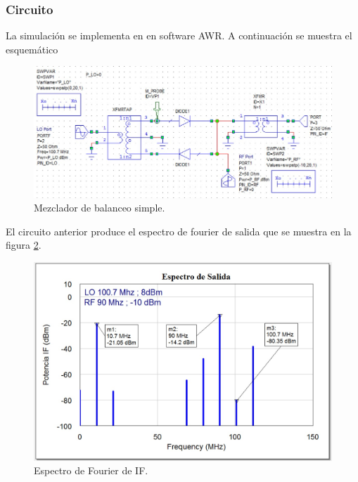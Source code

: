 \documentclass[twocolumn]{article}
\begin{document}
\subsubsection{Circuito}
La simulación se implementa en en software AWR. A continuación se muestra el esquemático
\begin{figure}[h]
  \centering    
	\includegraphics[width=\columnwidth]{imagenes/circuito2.jpg}
	\caption{Mezclador de balanceo simple.}\label{fig:circuito2}
\end{figure}

El circuito anterior produce el espectro de fourier de salida que se muestra en la figura \textcolor{blue}{\ref{fig:IF2}}.
\begin{figure}[h]
  \centering    
	\includegraphics[width=\columnwidth]{imagenes/IF2.jpg}
	\caption{Espectro de Fourier de IF.}\label{fig:IF2}
\end{figure}
%
\end{document}
